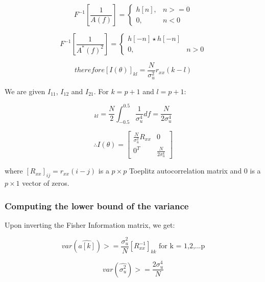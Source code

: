 \begin{equation}
    F^{-1}[\frac{1}{A(f)}]=
    \begin{cases}
      h[n], & n>=0 \\
      0, & n<0
    \end{cases}
  \end{equation}
  
  \begin{equation}
    F^{-1}[\frac{1}{A^*(f)^2}]=
    \begin{cases}
      h[-n] \star h[-n] \\
      0, & n>0
    \end{cases}
  \end{equation}
  
\begin{equation}
therefore [I(\theta)]_{kl} = \frac{N}{\sigma_u^2}r_{xx}(k-l)
\end{equation}

We are given $I_{11}$, $I_{12}$ and $I_{21}$. For $k=p+1$ and $l=p+1$:

\begin{equation}
[I(\theta)]_{kl} = \frac{N}{2} \int_{-0.5}^{0.5} \frac{1}{\sigma_u^4} df = \frac{N}{2\sigma_u^4}
\end{equation}

\begin{equation}
\therefore I(\theta) = 
\begin{bmatrix}
\frac{N}{\sigma_u^2}R_{xx} & 0 \\
0^T & \frac{N}{2\sigma_u^4}
\end{bmatrix}
\end{equation}

where $[R_{xx}]_{ij} = r_{xx}(i-j)$ is a $p \times p$ Toeplitz autocorrelation matrix and 0 is a $p \times 1$ vector of zeros.

\subsubsection{Computing the lower bound of the variance}

Upon inverting the Fisher Information matrix, we get:

\begin{equation}
var(\hat{a[k]}) >= \frac{\sigma_u^2}{N} [R_{xx}^{-1}]_{kk} \text{  for k = 1,2,...p}
\end{equation}

\begin{equation}
var(\hat{\sigma_u^2}) >= \frac{2\sigma_u^4}{N}
\end{equation}

